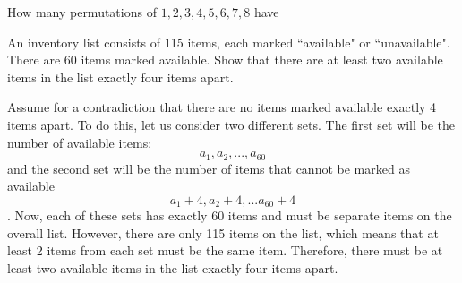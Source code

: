 \documentclass[10pt]{exam}
\begin{document}
\begin{questions}
\question[4] How many permutations of $1, 2, 3, 4, 5, 6, 7, 8$ have

\question[4] An inventory list consists of 115 items, each marked ``available" or ``unavailable". There are 60 items marked available. Show that there are at least two available items in the list exactly four items apart.
\begin{solution}
	Assume for a contradiction that there are no items marked available exactly 4 items apart. To do this, let us consider two different sets. The first set will be the number of available items: \[a_1,a_2,...,a_60\] and the second set will be the number of items that cannot be marked as available \[a_1+4,a_2+4,...a_{60}+4\]. Now, each of these sets has exactly 60 items and must be separate items on the overall list. However, there are only 115 items on the list, which means that at least 2 items from each set must be the same item. Therefore, there must be at least two available items in the list exactly four items apart.
\end{solution}



\end{questions}
\end{document}
